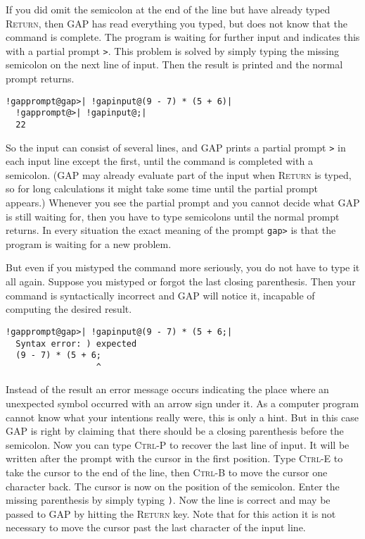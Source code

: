 \documentclass[a4paper,11pt]{report}
\begin{document}
{{ If you did omit the semicolon at the end of the line but have already typed \textsc{Return}, then \textsf{GAP} has read everything you typed, but does not know that the command is complete.
The program is waiting for further input and indicates this with a partial
prompt \texttt{{\textgreater}}. This problem is solved by simply typing the missing semicolon on the next
line of input. Then the result is printed and the normal prompt returns. 

 
\begin{Verbatim}[commandchars=!@|,fontsize=\small,frame=single,label=Example]
  !gapprompt@gap>| !gapinput@(9 - 7) * (5 + 6)|
  !gapprompt@>| !gapinput@;|
  22
\end{Verbatim}
 

 So the input can consist of several lines, and \textsf{GAP} prints a partial prompt \texttt{{\textgreater}} in each input line except the first, until the command is completed with a
semicolon. (\textsf{GAP} may already evaluate part of the input when \textsc{Return} is typed, so for long calculations it might take some time until the partial
prompt appears.) Whenever you see the partial prompt and you cannot decide
what \textsf{GAP} is still waiting for, then you have to type semicolons until the normal prompt
returns. In every situation the exact meaning of the prompt \texttt{gap{\textgreater}} is that the program is waiting for a new problem. 

 But even if you mistyped the command more seriously, you do not have to type
it all again. Suppose you mistyped or forgot the last closing parenthesis.
Then your command is syntactically incorrect and \textsf{GAP} will notice it, incapable of computing the desired result. 

 
\begin{Verbatim}[commandchars=!@|,fontsize=\small,frame=single,label=Example]
  !gapprompt@gap>| !gapinput@(9 - 7) * (5 + 6;|
  Syntax error: ) expected
  (9 - 7) * (5 + 6;
                  ^
\end{Verbatim}
 

  Instead of the result an error message occurs indicating the place where an
unexpected symbol occurred with an arrow sign \texttt{\texttt{}} under it. As a computer program cannot know what your intentions really were,
this is only a hint. But in this case \textsf{GAP} is right by claiming that there should be a closing parenthesis before the
semicolon. Now you can type \textsc{Ctrl-P} to recover the last line of input. It will be written after the prompt with
the cursor in the first position. Type \textsc{Ctrl-E} to take the cursor to the end of the line, then \textsc{Ctrl-B} to move the cursor one character back. The cursor is now on the position of
the semicolon. Enter the missing parenthesis by simply typing \texttt{)}. Now the line is correct and may be passed to \textsf{GAP} by hitting the \textsc{Return} key. Note that for this action it is not necessary to move the cursor past the
last character of the input line. 

}}
\end{document}
